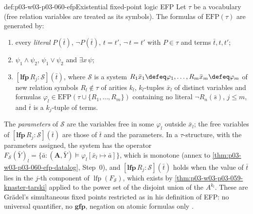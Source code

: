 \begin{hbdefinition}{def:p03-w03-p03-060-efp}{Existential fixed-point logic EFP}
Let \(\tau\) be a vocabulary (free relation variables are treated as its
symbols). The formulas of \(\mathrm{EFP}(\tau)\) are generated by:
\begin{enumerate}
\item every \emph{literal} \(P(\bar t)\), \(\neg P(\bar t)\), \(t=t'\),
      \(\neg\,t=t'\) with \(P\in\tau\) and terms \(\bar t,t,t'\);
\item \(\psi_1\wedge\psi_2\), \(\psi_1\vee\psi_2\) and \(\exists x\,\psi\);
\item \([\mathbf{lfp}\,R_j:\mathcal S](\bar t)\), where \(\mathcal S\) is a
      system \(R_1\bar x_1\defeq\varphi_1,\ldots,R_m\bar x_m\defeq\varphi_m\)
      of new relation symbols \(R_l\notin\tau\) of arities \(k_l\),
      \(k_l\)-tuples \(\bar x_l\) of distinct variables and formulas
      \(\varphi_l\in\mathrm{EFP}(\tau\cup\{R_1,\ldots,R_m\})\) containing
      no literal \(\neg R_n(\bar s)\), \(j\le m\), and \(\bar t\) is a
      \(k_j\)-tuple of terms.
\end{enumerate}
The \emph{parameters} of \(\mathcal S\) are the variables free in some
\(\varphi_l\) outside \(\bar x_l\); the free variables of
\([\mathbf{lfp}\,R_j:\mathcal S](\bar t)\) are those of \(\bar t\) and the
parameters. In a \(\tau\)-structure, with the parameters assigned, the
system has the operator
\(F_{\mathcal S}(\bar Y)_l=\{\bar a:(\mathbf A,\bar Y)\models\varphi_l[\bar x_l\mapsto\bar a]\}\),
which is monotone (annex to \cref{thm:p03-w03-p03-060-efp-datalog}, Step~0),
and \([\mathbf{lfp}\,R_j:\mathcal S](\bar t)\) holds when the value of
\(\bar t\) lies in the \(j\)-th component of
\(\operatorname{lfp}(F_{\mathcal S})\), which exists by
\cref{thm:p03-w03-p03-059-knaster-tarski} applied to the power set of the
disjoint union of the \(A^{k_l}\). These are Gr\"adel's simultaneous
fixed points \cite[Def.~3.3.39, p.~171]{Gradel2007FMTDescriptiveChapter}
restricted as in his definition of EFP: no universal quantifier, no
\(\mathbf{gfp}\), negation on atomic formulas only \cite[Def.~3.3.63,
p.~182]{Gradel2007FMTDescriptiveChapter}.
\end{hbdefinition}

